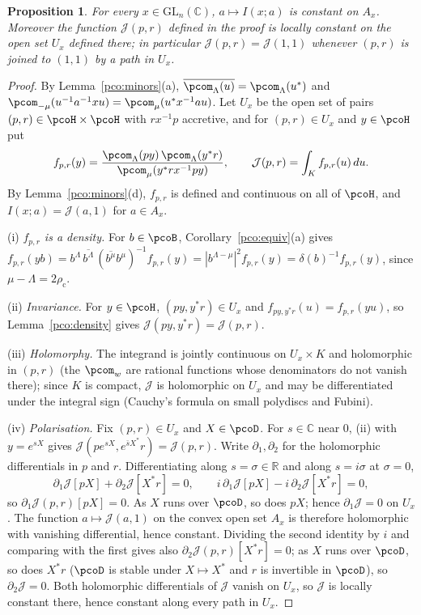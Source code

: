 \documentclass[10pt]{amsart}
\newtheorem{proposition}[theorem]{Proposition}
\theoremstyle{definition}
\theoremstyle{remark}
\newcommand{\C}{\mathbb C}
\newcommand{\R}{\mathbb R}
\begin{document}
\begin{proposition}\label{pco:indep}
For every $x\in\mathrm{GL}_n(\C)$, $a\mapsto I(x;a)$ is constant on $A_x$. Moreover the function
$\mathcal J(p,r)$ defined in the proof is locally constant on the open set $U_x$ defined there; in
particular $\mathcal J(p,r)=\mathcal J(1,1)$ whenever $(p,r)$ is joined to $(1,1)$ by a path in $U_x$.
\end{proposition}
\begin{proof}
By Lemma~\ref{pco:minors}(a), $\overline{\pcom_\Lambda(u)}=\pcom_\Lambda(u^*)$ and
$\pcom_{-\mu}(u^{-1}a^{-1}xu)=\pcom_\mu(u^*x^{-1}au)$. Let $U_x$ be the open set of pairs
$(p,r)\in\pcoH\times\pcoH$ with $rx^{-1}p$ accretive, and for $(p,r)\in U_x$ and $y\in\pcoH$ put
\[
f_{p,r}(y)=\frac{\pcom_\Lambda(py)\,\pcom_\Lambda(y^*r)}{\pcom_\mu(y^*rx^{-1}py)},\qquad
\mathcal J(p,r)=\int_Kf_{p,r}(u)\,du .
\]
By Lemma~\ref{pco:minors}(d), $f_{p,r}$ is defined and continuous on all of $\pcoH$, and
$I(x;a)=\mathcal J(a,1)$ for $a\in A_x$.

(i) \emph{$f_{p,r}$ is a density.} For $b\in\pcoB$, Corollary~\ref{pco:equiv}(a) gives
$f_{p,r}(yb)=b^\Lambda\,\overline{b^\Lambda}\,(\overline{b^\mu}b^\mu)^{-1}f_{p,r}(y)=|b^{\Lambda-\mu}|^2
f_{p,r}(y)=\delta(b)^{-1}f_{p,r}(y)$, since $\mu-\Lambda=2\rho_{\mathrm c}$.

(ii) \emph{Invariance.} For $y\in\pcoH$, $(py,y^*r)\in U_x$ and $f_{py,y^*r}(u)=f_{p,r}(yu)$, so
Lemma~\ref{pco:density} gives $\mathcal J(py,y^*r)=\mathcal J(p,r)$.

(iii) \emph{Holomorphy.} The integrand is jointly continuous on $U_x\times K$ and holomorphic in
$(p,r)$ (the $\pcom_w$ are rational functions whose denominators do not vanish there); since $K$ is
compact, $\mathcal J$ is holomorphic on $U_x$ and may be differentiated under the integral sign
(Cauchy's formula on small polydiscs and Fubini).

(iv) \emph{Polarisation.} Fix $(p,r)\in U_x$ and $X\in\pcoD$. For $s\in\C$ near $0$, (ii) with
$y=e^{sX}$ gives $\mathcal J(pe^{sX},e^{\bar sX^*}r)=\mathcal J(p,r)$. Write $\partial_1,\partial_2$
for the holomorphic differentials in $p$ and $r$. Differentiating along $s=\sigma\in\R$ and along
$s=i\sigma$ at $\sigma=0$,
\[
\partial_1\mathcal J[pX]+\partial_2\mathcal J[X^*r]=0,\qquad i\,\partial_1\mathcal J[pX]-
i\,\partial_2\mathcal J[X^*r]=0,
\]
so $\partial_1\mathcal J(p,r)[pX]=0$. As $X$ runs over $\pcoD$, so does $pX$; hence $\partial_1
\mathcal J=0$ on $U_x$. The function $a\mapsto\mathcal J(a,1)$ on the convex open set $A_x$ is
therefore holomorphic with vanishing differential, hence constant. Dividing the second identity by
$i$ and comparing with the first gives also $\partial_2\mathcal J(p,r)[X^*r]=0$; as $X$ runs over
$\pcoD$, so does $X^*r$ ($\pcoD$ is stable under $X\mapsto X^*$ and $r$ is invertible in $\pcoD$), so
$\partial_2\mathcal J=0$. Both holomorphic differentials of $\mathcal J$ vanish on $U_x$, so
$\mathcal J$ is locally constant there, hence constant along every path in $U_x$.
\end{proof}
\end{document}
